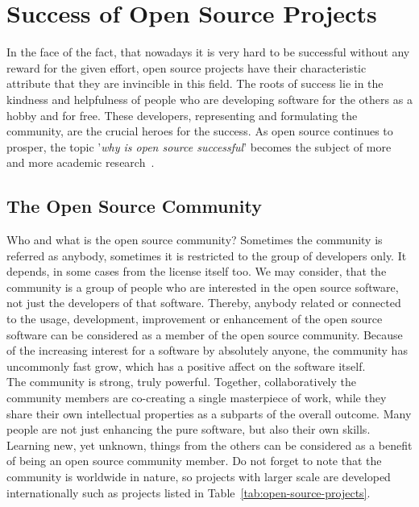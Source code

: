 \documentclass[12pt,a4paper]{article}
\theoremstyle{definition}
\begin{document}
\section{Success of Open Source Projects}

    In the face of the fact, that nowadays it is very hard to be successful without any reward for the given effort, open source projects have their characteristic attribute that they are invincible in this field. The roots of success lie in the kindness and helpfulness of people who are developing software for the others as a hobby and for free. These developers, representing and formulating the community, are the crucial heroes for the success. As open source continues to prosper, the topic '\textit{why is open source successful}' becomes the subject of more and more academic research~\cite{IEEE:open-source-success}.

    \subsection{The Open Source Community}

    Who and what is the open source community? Sometimes the community is referred as anybody, sometimes it is restricted to the group of developers only. It depends, in some cases from the license itself too. We may consider, that the community is a group of people who are interested in the open source software, not just the developers of that software. Thereby, anybody related or connected to the usage, development, improvement or enhancement of the open source software can be considered as a member of the open source community. Because of the increasing interest for a software by absolutely anyone, the community has uncommonly fast grow, which has a positive affect on the software itself.\\

    The community is strong, truly powerful. Together, collaboratively the community members are co-creating a single masterpiece of work, while they share their own intellectual properties as a subparts of the overall outcome. Many people are not just enhancing the pure software, but also their own skills. Learning new, yet unknown, things from the others can be considered as a benefit of being an open source community member. Do not forget to note that the community is worldwide in nature, so projects with larger scale are developed internationally such as projects listed in Table~\ref{tab:open-source-projects}.
\end{document}
